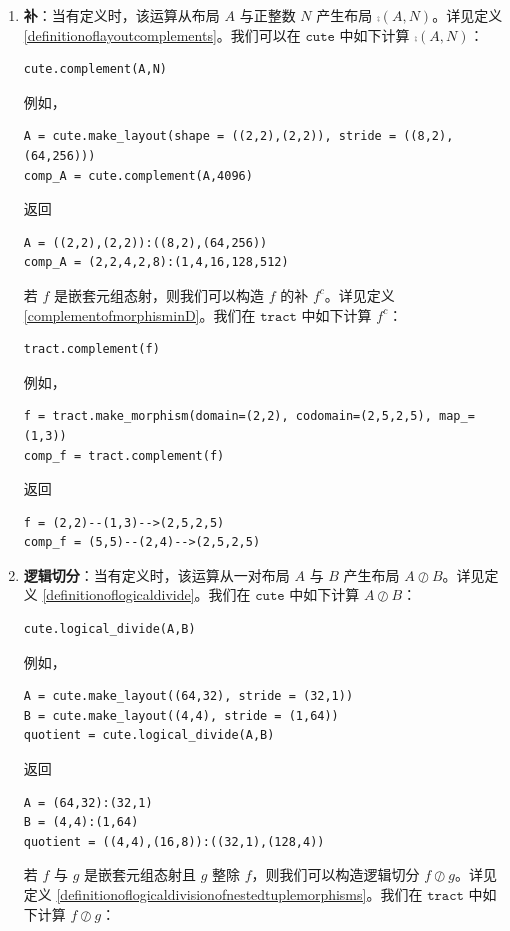 \begin{enumerate}[left=0pt]
\item {\bf 补}：当有定义时，该运算从布局 $A$ 与正整数 $N$ 产生布局 $\comp(A,N)$。详见定义 \ref{definitionoflayoutcomplements}。我们可以在 $\texttt{cute}$ 中如下计算 $\comp(A,N)$：
\begin{lstlisting}[language=cutedsl]
cute.complement(A,N)
\end{lstlisting}
例如，
\begin{lstlisting}[language=cutedsl]
A = cute.make_layout(shape = ((2,2),(2,2)), stride = ((8,2),(64,256)))
comp_A = cute.complement(A,4096)
\end{lstlisting}
返回
\begin{lstlisting}[language=cutedsl]
A = ((2,2),(2,2)):((8,2),(64,256))
comp_A = (2,2,4,2,8):(1,4,16,128,512)
\end{lstlisting}
若 $f$ 是嵌套元组态射，则我们可以构造 $f$ 的补 $f^c$。详见定义 \ref{complementofmorphisminD}。我们在 $\texttt{tract}$ 中如下计算 $f^c$：
\begin{lstlisting}[language=cutedsl]
tract.complement(f)
\end{lstlisting}
例如，
\begin{lstlisting}[language=cutedsl]
f = tract.make_morphism(domain=(2,2), codomain=(2,5,2,5), map_=(1,3))
comp_f = tract.complement(f)
\end{lstlisting}
返回
\begin{lstlisting}[language=cutedsl]
f = (2,2)--(1,3)-->(2,5,2,5)
comp_f = (5,5)--(2,4)-->(2,5,2,5)
\end{lstlisting}
\item {\bf 逻辑切分}：当有定义时，该运算从一对布局 $A$ 与 $B$ 产生布局 $A \oslash B$。详见定义 \ref{definitionoflogicaldivide}。我们在 $\texttt{cute}$ 中如下计算 $A \oslash B$：
\begin{lstlisting}[language=cutedsl]
cute.logical_divide(A,B)
\end{lstlisting}
例如，
\begin{lstlisting}[language=cutedsl]
A = cute.make_layout((64,32), stride = (32,1))
B = cute.make_layout((4,4), stride = (1,64))
quotient = cute.logical_divide(A,B)
\end{lstlisting}
返回
\begin{lstlisting}[language=cutedsl]
A = (64,32):(32,1)
B = (4,4):(1,64)
quotient = ((4,4),(16,8)):((32,1),(128,4))
\end{lstlisting}
若 $f$ 与 $g$ 是嵌套元组态射且 $g$ 整除 $f$，则我们可以构造逻辑切分 $f \oslash g$。详见定义 \ref{definitionoflogicaldivisionofnestedtuplemorphisms}。我们在 $\texttt{tract}$ 中如下计算 $f \oslash g$：

\end{enumerate}
